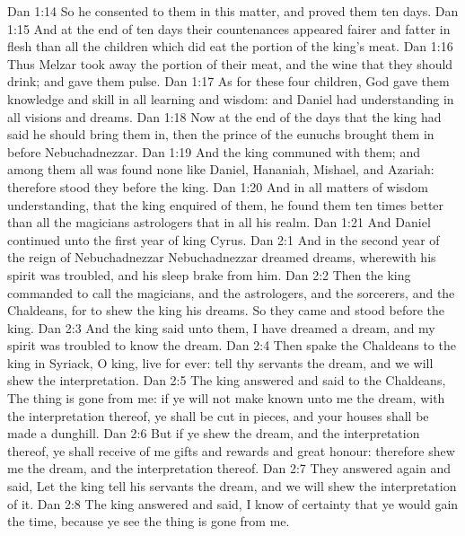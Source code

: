 \vs Dan 1:14 So he consented to them in this matter, and proved them ten days.
\vs Dan 1:15 And at the end of ten days their countenances appeared fairer and fatter in flesh than all the children which did eat the portion of the king's meat.
\vs Dan 1:16 Thus Melzar took away the portion of their meat, and the wine that they should drink; and gave them pulse.
\vs Dan 1:17 As for these four children, God gave them knowledge and skill in all learning and wisdom: and Daniel had understanding in all visions and dreams.
\vs Dan 1:18 Now at the end of the days that the king had said he should bring them in, then the prince of the eunuchs brought them in before Nebuchadnezzar.
\vs Dan 1:19 And the king communed with them; and among them all was found none like Daniel, Hananiah, Mishael, and Azariah: therefore stood they before the king.
\vs Dan 1:20 And in all matters of wisdom  understanding, that the king enquired of them, he found them ten times better than all the magicians  astrologers that  in all his realm.
\vs Dan 1:21 And Daniel continued  unto the first year of king Cyrus.
\vs Dan 2:1 And in the second year of the reign of Nebuchadnezzar Nebuchadnezzar dreamed dreams, wherewith his spirit was troubled, and his sleep brake from him.
\vs Dan 2:2 Then the king commanded to call the magicians, and the astrologers, and the sorcerers, and the Chaldeans, for to shew the king his dreams. So they came and stood before the king.
\vs Dan 2:3 And the king said unto them, I have dreamed a dream, and my spirit was troubled to know the dream.
\vs Dan 2:4 Then spake the Chaldeans to the king in Syriack, O king, live for ever: tell thy servants the dream, and we will shew the interpretation.
\vs Dan 2:5 The king answered and said to the Chaldeans, The thing is gone from me: if ye will not make known unto me the dream, with the interpretation thereof, ye shall be cut in pieces, and your houses shall be made a dunghill.
\vs Dan 2:6 But if ye shew the dream, and the interpretation thereof, ye shall receive of me gifts and rewards and great honour: therefore shew me the dream, and the interpretation thereof.
\vs Dan 2:7 They answered again and said, Let the king tell his servants the dream, and we will shew the interpretation of it.
\vs Dan 2:8 The king answered and said, I know of certainty that ye would gain the time, because ye see the thing is gone from me.
